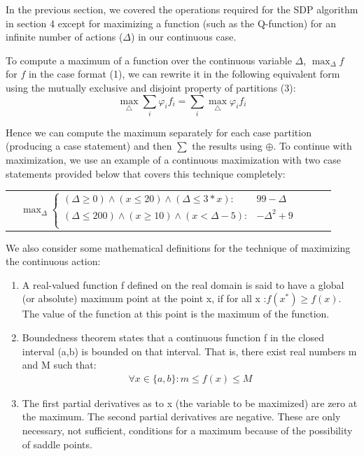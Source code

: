 \documentclass[letterpaper]{article}
\renewcommand{\-}{\text{-}}
\begin{document}
In the previous section, we covered the operations required for the SDP algorithm in section 4 except for maximizing a function (such as the Q-function) for an infinite number of actions ($\Delta$) in our continuous case. 

To compute a maximum of a function over the continuous variable $\Delta$, $\max_{\Delta} f $ for $f$
in the case format (1), we can rewrite it in the following equivalent form using the mutually exclusive and disjoint property of partitions (3):
\begin{equation}
\max_{\bigtriangleup}\sum_{i}\varphi_{i}f_{i}=\sum_{i}\max_{\bigtriangleup}\varphi_{i}f_{i}
\end{equation}

Hence we can compute the maximum separately for each case partition (producing a case statement) and then $\sum$ the results using $\oplus$.
To continue with maximization, we use an example of a continuous maximization with two case statements provided below that covers this technique completely:

{\footnotesize
\begin{center}
\begin{tabular}{r c c c l}
&
\hspace{-9mm} $\max_{\Delta}
  \begin{cases}
(\Delta  \geq 0) \wedge (x \leq 20) \wedge (\Delta \leq 3*x) : & 99-\Delta \\ 
(\Delta \leq 200) \wedge (x \geq 10) \wedge (x < \Delta - 5) : & - \Delta^{2} +9 \\ 
  \end{cases}$
\end{tabular}
\end{center}
}

We also consider some mathematical definitions for the technique of maximizing the continuous action: 
\begin{enumerate}
\item A real-valued function f defined on the real domain is said to have a global (or absolute) maximum point at the point x, if for all x :$ f(x^{*}) \geq f(x) $. The value of the function at this point is the maximum of the function.
\item Boundedness theorem states that a continuous function f in the closed interval (a,b) is bounded on that interval. That is, there exist real numbers m and M such that:
\begin{align*}
\forall x \in \{a,b\} : m \leq f(x) \leq M 
\end{align*}
\item The first partial derivatives as to x (the variable to be maximized) are zero at the maximum. The second partial derivatives are negative. These are only necessary, not sufficient, conditions for a maximum because of the possibility of saddle points.
\end{enumerate}
\end{document}

